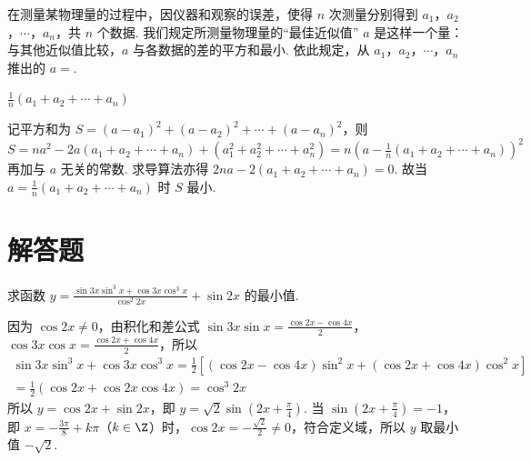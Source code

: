 \begin{problem}
在测量某物理量的过程中，因仪器和观察的误差，使得 \(n\) 次测量分别得到 \(a_{1}\)，\(a_{2}\)，\(\cdots\)，\(a_{n}\)，共 \(n\) 个数据. 我们规定所测量物理量的“最佳近似值” \(a\) 是这样一个量：与其他近似值比较，\(a\) 与各数据的差的平方和最小. 依此规定，从 \(a_{1}\)，\(a_{2}\)，\(\cdots\)，\(a_{n}\) 推出的 \(a=\)\fillinblank{}.
\end{problem}

\begin{answer}
\(\frac{1}{n}\left( a_{1}+a_{2}+\cdots+a_{n} \right)\)
\end{answer}

\begin{solution}
记平方和为 \(S=\left( a-a_{1} \right)^{2}+\left( a-a_{2} \right)^{2}+\cdots+\left( a-a_{n} \right)^{2}\)，则 \(S=na^{2}-2a\left( a_{1}+a_{2}+\cdots+a_{n} \right)+\left( a_{1}^{2}+a_{2}^{2}+\cdots+a_{n}^{2} \right)=n\left( a-\frac{1}{n}\left( a_{1}+a_{2}+\cdots+a_{n} \right) \right)^{2}\) 再加与 \(a\) 无关的常数. 求导算法亦得 \(2na-2\left( a_{1}+a_{2}+\cdots+a_{n} \right)=0\). 故当 \(a=\frac{1}{n}\left( a_{1}+a_{2}+\cdots+a_{n} \right)\) 时 \(S\) 最小.
\end{solution}

\section{解答题}

\begin{problem}
求函数 \(y=\frac{\sin3x\sin^{3}x+\cos3x\cos^{3}x}{\cos^{2}2x}+\sin2x\) 的最小值.
\end{problem}

\begin{solution}
因为 \(\cos2x\neq 0\)，由积化和差公式 \(\sin3x\sin x=\frac{\cos2x-\cos4x}{2}\)，\(\cos3x\cos x=\frac{\cos2x+\cos4x}{2}\)，所以
\[ \begin{gathered}
\sin3x\sin^{3}x+\cos3x\cos^{3}x=\frac{1}{2}\left[\left(\cos2x-\cos4x\right)\sin^{2}x+\left(\cos2x+\cos4x\right)\cos^{2}x\right] \\
=\frac{1}{2}\left(\cos2x+\cos2x\cos4x\right)=\cos^{3}2x
\end{gathered} \]
所以 \(y=\cos2x+\sin2x\)，即 \(y=\sqrt{2}\sin\left(2x+\frac{\pi}{4}\right)\). 当 \(\sin\left(2x+\frac{\pi}{4}\right)=-1\)，即 \(x=-\frac{3\pi}{8}+k\pi\)（\(k\in\Z\)）时，\(\cos2x=-\frac{\sqrt{2}}{2}\neq 0\)，符合定义域，所以 \(y\) 取最小值 \(-\sqrt{2}\).
\end{solution}

